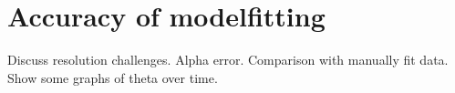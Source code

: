 \section{Accuracy of modelfitting}
Discuss resolution challenges.
Alpha error.
Comparison with manually fit data.
Show some graphs of theta over time.